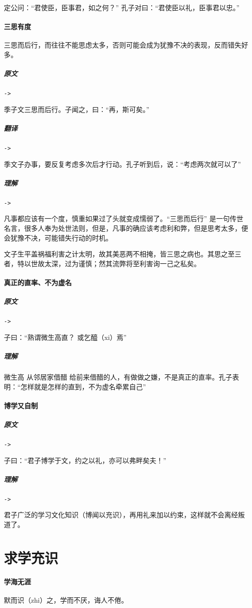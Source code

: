 \documentclass[UTF8,a4paper,8pt]{ctexbook}
\begin{document}
				定公问：“君使臣，臣事君，如之何？” 孔子对曰：“君使臣以礼，臣事君以忠。”
			
		
		\paragraph{三思有度}
			三思而后行，而往往不能思虑太多，否则可能会成为犹豫不决的表现，反而错失好多。
			
			\subparagraph{原文}\verb|->|
				
				季子文三思而后行。子闻之，曰：“再，斯可矣。”	
				
			\subparagraph{翻译}\verb|->|
				
				季文子办事，要反复考虑多次后才行动。孔子听到后，说：“考虑两次就可以了”	
			
			\subparagraph{理解}\verb|->|
				
				凡事都应该有一个度，慎重如果过了头就变成懦弱了。“三思而后行” 是一句传世名言，很多人奉为处世法则，但是，凡事的确应该考虑利和弊，但是思考太多，便会犹豫不决，可能错失行动的时机。
				
				
				文子生平盖祸福利害之计太明，故其美恶两不相掩，皆三思之病也。其思之至三者，特以世故太深，过为谨慎；然其流弊将至利害询一己之私矣。
				
		\paragraph{真正的直率、不为虚名}
			\subparagraph{原文}\verb|->|
			
				子曰：“熟谓微生高直？ 或乞醯（xi）焉”
				
			\subparagraph{理解}
				微生高 从邻居家借醋 给前来借醋的人，有做做之嫌，不是真正的直率。孔子表明：“怎样就是怎样的直到，不为虚名牵累自己”	
		
		\paragraph{博学又自制}
			\subparagraph{原文}\verb|->|
			
				子曰：“君子博学于文，约之以礼，亦可以弗畔矣夫！”	
			\subparagraph{理解}\verb|->|
			
				君子广泛的学习文化知识（博闻以充识），再用礼来加以约束，这样就不会离经叛道了。
		
	\section{求学充识}
		\paragraph{学海无涯}
			默而识（zhi）之，学而不厌，诲人不倦。
			
\end{document}
